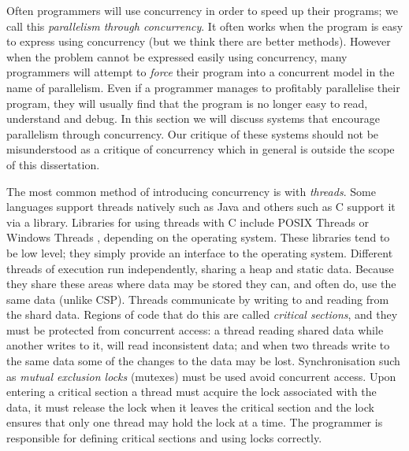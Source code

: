 Often programmers will use concurrency in order to speed up their programs;
we call this \emph{parallelism through concurrency}.
It often works when the program is easy to express using concurrency
(but we think there are better methods).
However when the problem cannot be expressed easily using concurrency,
many programmers will attempt to \emph{force} their program into a concurrent
model in the name of parallelism.
Even if a programmer manages to profitably parallelise their program,
they will usually find that the program is no longer easy to read, understand
and debug.
In this section we will discuss systems that encourage parallelism through
concurrency.
Our critique of these systems should not be misunderstood as a critique of
concurrency which in general is outside the scope of this dissertation.

The most common method of introducing concurrency is with \emph{threads}.
Some languages support threads natively such as Java \citep{java-threads}
and others such as C \citep{c} support it via a library.
Libraries for using threads with C include
POSIX Threads \citep{butenhof1997:pthreads} or Windows
Threads \citep{winthreads}, depending on the operating system.
These libraries tend to be low level;
they simply provide an interface to the operating system.
Different threads of execution run independently,
sharing a heap and static data.
Because they share these areas where data may be stored they can, and often do,
use the same data (unlike CSP).
Threads communicate by writing to and reading from the shard data.
Regions of code that do this are called \emph{critical sections},
and they must be protected from concurrent access:
a thread reading shared data while another writes to it, will read
inconsistent data;
and when two threads write to the same data some of the changes to the data
may be lost.
Synchronisation such as \emph{mutual exclusion locks} (mutexes)
\citep{Dijkstra:Mutex} must be used avoid concurrent access.
Upon entering a critical section a thread must acquire the lock associated with
the data,
it must release the lock when it leaves the critical section and the lock
ensures that only one thread may hold the lock at a time.
The programmer is responsible for defining critical sections and using locks
correctly.


